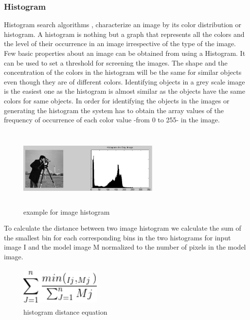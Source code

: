 \subsubsection{Histogram}
Histogram search algorithms , characterize an image by its
color distribution or histogram. A histogram is nothing but
a graph that represents all the colors and the level of their
occurrence in an image irrespective of the type of the
image. 
\vskip 0.2in
Few basic properties about an image can be obtained
from using a Histogram. It can be used to set a threshold for
screening the images. The shape and the concentration of
the colors in the histogram will be the same for similar
objects even though they are of different colors.
\vskip 0.2in
Identifying objects in a grey scale image is the easiest one as the
histogram is almost similar as the objects have the same
colors for same objects. In order for identifying the objects
in the images or generating the histogram the system has to
obtain the array values of the frequency of occurrence of each color value -from 0 to 255- in the image.
\vskip 0.2in

\begin{figure}[H]
    \centering
    \includegraphics[width=70mm,height=40mm]{Images/hist.png}
    \caption{example for image histogram}
  \end{figure}
\vskip 0.2in

To calculate the distance between two image histogram we calculate the sum of the
smallest bin for each corresponding bins in the two histograms
for input image I and the model image M normalized to the
number of pixels in the model image.
\vskip 0.2in

\begin{figure}[H]
    \centering
    \includegraphics[width=40mm,height=20mm]{Images/eq.png}
    \caption{histogram distance equation}
  \end{figure}

